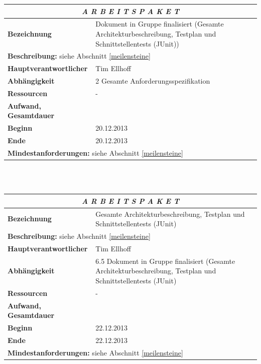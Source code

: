 \documentclass[fontsize=12pt,paper=a4,twoside]{scrartcl}
\begin{document}
\begin{tabular}{p{7.5cm}|p{7.5cm}}\toprule
\multicolumn{2}{c}{\textbf{\textit{A R B E I T S P A K E T \quad 6.5}}} \\ \toprule \hline
\textbf{Bezeichnung} & Dokument in Gruppe finalisiert (Gesamte Architekturbeschreibung, Testplan und Schnittstellentests (JUnit))\\\hline
\multicolumn{2}{p{15cm}}{\textbf{Beschreibung:} \newline 
siehe Abschnitt \ref{meilensteine} }  \\\hline
\textbf{Hauptverantwortlicher} & Tim Ellhoff \\\hline
\textbf{Abhängigkeit} & 2 Gesamte Anforderungsspezifikation
\\\hline
\textbf{Ressourcen} & -\\\hline
\textbf{Aufwand, Gesamtdauer} & \\\hline
\textbf{Beginn} & 20.12.2013 \\\hline
\textbf{Ende} & 20.12.2013\\\hline
\multicolumn{2}{p{15cm}}{\textbf{Mindestanforderungen: } \newline
siehe Abschnitt \ref{meilensteine}}  \\ \toprule
\end{tabular} \\\\

\begin{tabular}{p{7.5cm}|p{7.5cm}}\toprule
\multicolumn{2}{c}{\textbf{\textit{A R B E I T S P A K E T \quad 6.6}}} \\ \toprule \hline
\textbf{Bezeichnung} & Gesamte Architekturbeschreibung, Testplan und Schnittstellentests (JUnit)\\\hline
\multicolumn{2}{p{15cm}}{\textbf{Beschreibung:} \newline 
siehe Abschnitt \ref{meilensteine} }  \\\hline
\textbf{Hauptverantwortlicher} & Tim Ellhoff \\\hline
\textbf{Abhängigkeit} & 6.5 Dokument in Gruppe finalisiert (Gesamte Architekturbeschreibung, Testplan und Schnittstellentests (JUnit)\\\hline
\textbf{Ressourcen} & -\\\hline
\textbf{Aufwand, Gesamtdauer} & \\\hline
\textbf{Beginn} & 22.12.2013 \\\hline
\textbf{Ende} & 22.12.2013\\\hline
\multicolumn{2}{p{15cm}}{\textbf{Mindestanforderungen: } \newline
siehe Abschnitt \ref{meilensteine}}  \\ \toprule
\end{tabular} \\\\
\end{document}
